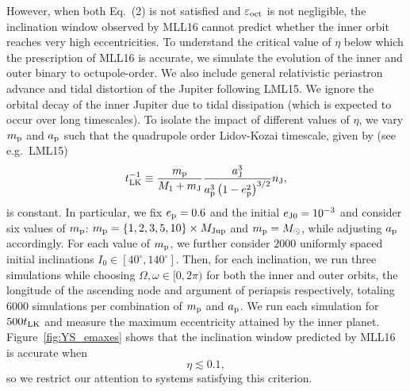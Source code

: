 \documentclass[11pt]{article}
\newcommand*{\p}[1]{\left(#1\right)}
\newcommand*{\s}[1]{\left[#1\right]}
\newcommand*{\z}[1]{\left\{#1\right\}}
\begin{document}
However, when both
Eq.~(2) is not satisfied and $\varepsilon_{\rm oct}$ is not negligible,
the inclination window observed by MLL16
cannot predict whether the inner orbit reaches very high eccentricities.
To understand the critical value of $\eta$ below which the prescription of MLL16
is accurate, we simulate the evolution of the inner and outer binary to
octupole-order. We also include general relativistic periastron advance and
tidal distortion of the Jupiter following LML15.
We ignore the orbital decay of the inner Jupiter due to tidal dissipation (which
is expected to occur over long timescales). To isolate the impact of different
values of $\eta$, we vary $m_{\rm p}$ and $a_{\rm p}$ such that the quadrupole
order Lidov-Kozai timescale, given by (see e.g.\ LML15)
\begin{equation}
    t_{\rm LK}^{-1} \equiv \frac{m_{\rm p}}{M_1 + m_{\rm J}}
        \frac{a_{\rm J}^3}{a_{\rm p}^3\p{1 - e_{\rm p}^2}^{3/2}}n_{\rm J},
        \label{eq:t_LK}
\end{equation}
is constant. In particular, we fix $e_{\rm p} = 0.6$ and the initial $e_{\rm J0}
= 10^{-3}$ and consider six values of $m_{\rm p}$: $m_{\rm p} = \z{1, 2, 3, 5,
10} \times M_{\rm Jup}$ and $m_{\rm p} = M_{\odot}$, while adjusting $a_{\rm p}$
accordingly. For each value of $m_{\rm p}$, we further consider $2000$ uniformly
spaced initial inclinations $I_0 \in \s{40^\circ, 140^\circ}$. Then, for each
inclination, we run three simulations while choosing $\Omega, \omega \in [0,
2\pi)$ for both the inner and outer orbits, the longitude of the ascending node
and argument of periapsis respectively, totaling $6000$ simulations per
combination of $m_{\rm p}$ and $a_{\rm p}$. We run each simulation for $500
t_{\rm LK}$ and measure the maximum eccentricity attained by the inner planet.
Figure~\ref{fig:YS_emaxes} shows that the inclination window
predicted by MLL16 is accurate when
\begin{equation}
    \eta \lesssim 0.1,
\end{equation}
so we restrict our attention to systems satisfying this criterion.
\end{document}
